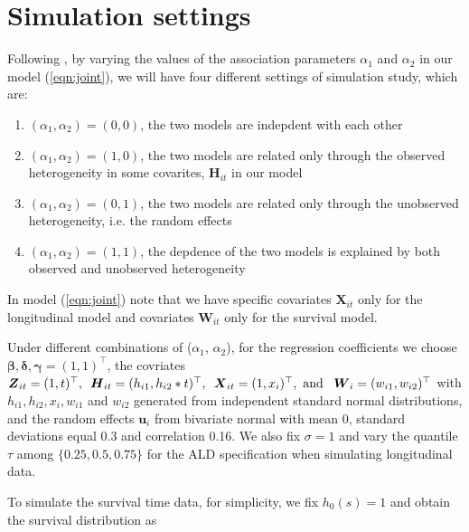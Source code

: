 \section{Simulation settings }
Following \citep{farcomeni2014longitudinal}, by varying the values of the association parameters $\alpha_1$ and $\alpha_2$ in our model (\ref{eqn:joint}), we will have four different settings of simulation study, which are:

\begin{enumerate}
\item $(\alpha_1, \alpha_2)=(0, 0)$, the two models are indepdent with each other
\item $(\alpha_1, \alpha_2)=(1, 0)$, the two models are related only through the observed heterogeneity in some covarites, ${\boldsymbol H}_{it}$ in our model
\item $(\alpha_1, \alpha_2)=(0, 1)$, the two models are related only through the unobserved heterogeneity, i.e. the random effects
\item $(\alpha_1, \alpha_2)=(1, 1)$, the depdence of the two models is explained by both observed and unobserved heterogeneity
\end{enumerate}


In model (\ref{eqn:joint}) note that we have specific covariates ${\boldsymbol X}_{it}$ only for the longitudinal model and covariates ${\boldsymbol W}_{it}$ only for the survival model.


Under different combinations of ($\alpha_1$, $\alpha_2$), for the regression coefficients we choose $\boldsymbol{\beta, \delta, \gamma}=(1, 1)^{\top}$, the covriates ${\boldsymbol Z}_{it}=(1, t)^{\top},\hspace{0.5em} {\boldsymbol H}_{it}=(h_{i1}, h_{i2}*t)^{\top},\hspace{0.5em} {\boldsymbol X}_{it}=(1, x_i)^{\top},\mbox{ and }\hspace{0.5em} {\boldsymbol W}_{i}=(w_{i1}, w_{i2})^{\top}$ with $h_{i1}, h_{i2}, x_i, w_{i1}$ and $w_{i2}$ generated from independent standard normal distributions, and the random effects  $\boldsymbol{u}_i$ from bivariate normal with mean 0, standard deviations equal 0.3 and correlation 0.16. We also fix $\sigma=1$ and vary the quantile $\tau$ among $\{0.25, 0.5, 0.75\}$ for the ALD specification when simulating longitudinal data.

To simulate the survival time data, for simplicity, we fix $h_0(s)=1$ and obtain the survival distribution as 

